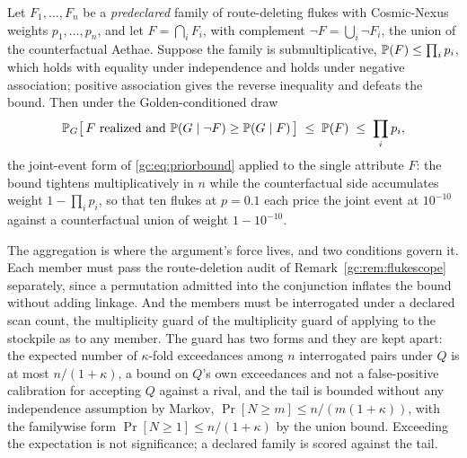 \begin{proposition}\label{gc:prop:stockpile}
Let $F_1,\dots,F_n$ be a \emph{predeclared} family of route-deleting
flukes with Cosmic-Nexus weights $p_1,\dots,p_n$, and let
$F=\bigcap_iF_i$, with complement $\neg F=\bigcup_i\neg F_i$, the union
of the counterfactual Aethae. Suppose the family is submultiplicative,
$\mathbb{P}(F)\le\prod_ip_i$, which holds with equality under independence and
holds under negative association; positive association gives the reverse
inequality and defeats the bound. Then under the Golden-conditioned draw
\begin{equation}\label{gc:eq:stockpile}
\mathbb{P}_G\bigl[\,F\text{ realized and }\mathbb{P}(G\mid\neg F)\ge\mathbb{P}(G\mid F)\,\bigr]
\;\le\;\mathbb{P}(F)\;\le\;\prod_ip_i,
\end{equation}
the joint-event form of \eqref{gc:eq:priorbound} applied to the single
attribute $F$: the bound tightens multiplicatively in $n$ while the
counterfactual side accumulates weight $1-\prod_ip_i$, so that ten
flukes at $p=0.1$ each price the joint event at $10^{-10}$ against a
counterfactual union of weight $1-10^{-10}$.
\end{proposition}

\noindent The aggregation is where the argument's force lives, and two
conditions govern it. Each member must pass the
route-deletion audit of Remark~\ref{gc:rem:flukescope} separately,
since a permutation admitted into the conjunction inflates the bound
without adding linkage. And the members must be interrogated under a
declared scan count, the multiplicity guard of
the multiplicity guard of \cite{GoldenTargeted} applying to the stockpile as to any member.
The guard has two forms and they are kept apart: the expected number of $\kappa$-fold exceedances among $n$ interrogated pairs under $Q$ is at most $n/(1+\kappa)$, a bound on $Q$'s own exceedances and not a false-positive calibration for accepting $Q$ against a rival, and the tail is bounded without any independence
assumption by Markov, $\Pr[N\ge m]\le n/(m(1+\kappa))$, with the
familywise form $\Pr[N\ge1]\le n/(1+\kappa)$ by the union bound.
Exceeding the expectation is not significance; a declared family is
scored against the tail.

